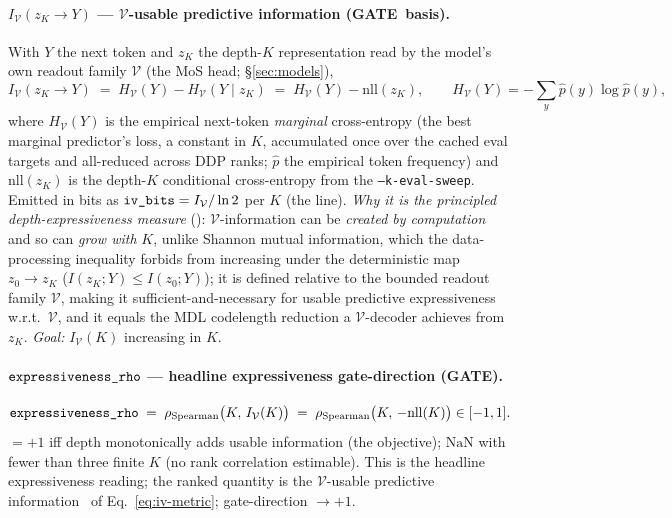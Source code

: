 \documentclass[11pt]{article}
\newcommand{\code}[1]{\texttt{#1}}
\newcommand{\GATE}{\textcolor{gate}{\textbf{GATE}}}
\begin{document}
\paragraph{\(I_{\mathcal V}(z_K\!\to\!Y)\) --- \(\mathcal V\)-usable predictive information (\GATE\ basis).}
With \(Y\) the next token and \(z_K\) the depth-\(K\) representation read by the model's own readout
family \(\mathcal V\) (the MoS head; \S\ref{sec:models}),
\begin{equation}
\label{eq:iv-metric}
  I_{\mathcal V}(z_K\!\to\!Y)
  \;=\;
  H_{\mathcal V}(Y)-H_{\mathcal V}(Y\mid z_K)
  \;=\;
  H_{\mathcal V}(Y)-\mathrm{nll}(z_K),
  \qquad
  H_{\mathcal V}(Y)=-\sum_y\hat p(y)\log\hat p(y),
\end{equation}
where \(H_{\mathcal V}(Y)\) is the empirical next-token \emph{marginal} cross-entropy (the best
marginal predictor's loss, a constant in \(K\), accumulated once over the cached eval targets and
all-reduced across DDP ranks; \(\hat p\) the empirical token frequency) and \(\mathrm{nll}(z_K)\) is the
depth-\(K\) conditional cross-entropy from the \code{--k-eval-sweep}.  Emitted in bits as
\(\code{\detokenize{iv_bits}}=I_{\mathcal V}/\ln 2\) per \(K\) (the \code{}
line).  \emph{Why it is the principled depth-expressiveness measure} (\cite{vinfo,vusable}): \(\mathcal
V\)-information can be \emph{created by computation} and so can \emph{grow with} \(K\), unlike Shannon
mutual information, which the data-processing inequality forbids from increasing under the deterministic
map \(z_0\!\to\!z_K\) (\(I(z_K;Y)\le I(z_0;Y)\)); it is defined relative to the bounded readout family
\(\mathcal V\), making it sufficient-and-necessary for usable predictive expressiveness w.r.t.\ \(\mathcal
V\), and it equals the MDL codelength reduction a \(\mathcal V\)-decoder achieves from \(z_K\).
\emph{Goal:} \(I_{\mathcal V}(K)\) increasing in \(K\).

\paragraph{\(\code{\detokenize{expressiveness_rho}}\) --- headline expressiveness gate-direction (\GATE).}
\begin{equation}
\label{eq:expr-rho}
  \code{\detokenize{expressiveness_rho}}
  \;=\;
  \rho_{\rm Spearman}\bigl(K,\,I_{\mathcal V}(K)\bigr)
  \;=\;
  \rho_{\rm Spearman}\bigl(K,\,-\mathrm{nll}(K)\bigr)\in[-1,1].
\end{equation}
\(=+1\) iff depth monotonically adds usable information (the objective); \(\mathrm{NaN}\) with fewer than
three finite \(K\) (no rank correlation estimable).  This is the headline expressiveness reading; the
ranked quantity is the \(\mathcal V\)-usable predictive information~\cite{vinfo} of
Eq.~\eqref{eq:iv-metric}; gate-direction \(\to+1\).
\end{document}
